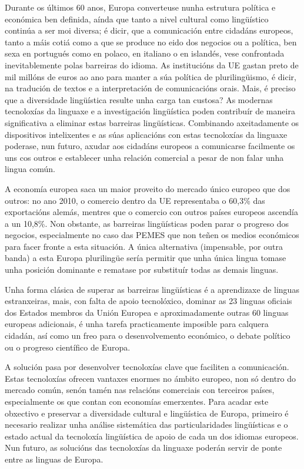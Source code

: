 \begin{multicols}{2}

Durante os últimos 60 anos, Europa converteuse nunha estrutura política e económica ben definida, aínda que tanto a nivel cultural como lingüístico continúa a ser moi diversa; é dicir, que a comunicación entre cidadáns europeos, tanto a máis cotiá como a que se produce no eido dos negocios ou a política, ben sexa en portugués como en polaco, en italiano o en islandés, vese confrontada inevitablemente polas barreiras do idioma. As institucións da UE gastan preto de mil millóns de euros ao ano para manter a súa política de plurilingüismo, é dicir, na tradución de textos e a interpretación de comunicacións orais. Mais, é preciso que a diversidade lingüística resulte unha carga tan custosa? As modernas tecnoloxías da linguaxe e a investigación lingüística poden contribuír de maneira significativa a eliminar estas barreiras lingüísticas. Combinando axeitadamente os dispositivos intelixentes e as súas aplicacións con estas tecnoloxías da linguaxe poderase, nun futuro, axudar aos cidadáns europeos a comunicarse facilmente os uns cos outros e establecer unha relación comercial a pesar de non falar unha lingua común. 


A economía europea saca un maior proveito do mercado único europeo que dos outros: no ano 2010, o comercio dentro da UE representaba o 60,3\% das exportacións alemás, mentres que o comercio con outros países europeos ascendía a un 10,8\%. Non obstante, as barreiras lingüísticas poden parar o progreso dos negocios, especialmente no caso das PEMES que non teñen os medios económicos para facer fronte a esta situación. A única alternativa (impensable, por outra banda) a esta Europa plurilingüe sería permitir que unha única lingua tomase unha posición dominante e rematase por substituír todas as demais linguas.

Unha forma clásica de superar as barreiras lingüísticas é a aprendizaxe de linguas estranxeiras, mais, con falta de apoio tecnolóxico, dominar as 23 linguas oficiais dos Estados membros da Unión Europea e aproximadamente outras 60 linguas europeas adicionais, é unha tarefa practicamente imposible para calquera cidadán, así como un freo para o desenvolvemento económico, o debate político ou o progreso científico de Europa.

A solución pasa por desenvolver tecnoloxías clave que faciliten a comunicación. Estas tecnoloxías ofrecen vantaxes enormes no ámbito europeo, non só dentro do mercado común, senón tamén nas relacións comerciais con terceiros países, especialmente os que contan con economías emerxentes. Para acadar este obxectivo e preservar a diversidade cultural e lingüística de Europa, primeiro é necesario realizar unha análise sistemática das particularidades lingüísticas e o estado actual da tecnoloxía lingüística de apoio de cada un dos idiomas europeos. Nun futuro, as solucións das tecnoloxías da linguaxe poderán servir de ponte entre as linguas de Europa.


\end{multicols}
